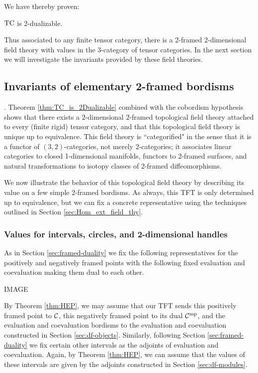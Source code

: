 \documentclass{amsart}
\begin{document}
We have thereby proven:
\begin{theorem} \label{thm:TC_is_2Dualizable}
	$\mathrm{TC}$ is 2-dualizable. 
\end{theorem}

\nid Thus associated to any finite tensor category, there is a 2-framed 2-dimensional field theory with values in the 3-category of tensor categories.  In the next section we will investigate the invariants provided by these field theories.

\subsection{Invariants of elementary 2-framed bordisms}
. %
Theorem \ref{thm:TC_is_2Dualizable} combined with the cobordism hypothesis shows that there exists a $2$-dimensional $2$-framed topological field theory attached to every (finite rigid) tensor category, and that this topological field theory is unique up to equivalence.  This field theory is ``categorified" in the sense that it is a functor of $(3,2)$-categories, not merely $2$-categories; it associates linear categories to closed 1-dimensional manifolds, functors to 2-framed surfaces, and natural transformations to isotopy classes of 2-framed diffeomorphisms. 

We now illustrate the behavior of this topological field theory by describing its value on a few simple 2-framed bordisms.  As always, this TFT is only determined up to equivalence, but we can fix a concrete representative using the techniques outlined in Section \ref{sec:Hom_ext_field_thy}.

\subsubsection{Values for intervals, circles, and 2-dimensional handles}

As in Section \ref{sec:framed-duality} we fix the following representatives for the positively and negatively framed points with the following fixed evaluation and coevaluation making them dual to each other.

IMAGE

By Theorem \ref{thm:HEP}, we may assume that our TFT sends this positively framed point to $\mathcal C$, this negatively framed point to its dual $\mathcal C^{\mathrm{mp}}$, and the evaluation and coevaluation bordisms to the evaluation and coevaluation constructed in Section \ref{sec:df-objects}.  Similarly, following Section \ref{sec:framed-duality} we fix certain other intervals as the adjoints of evaluation and coevaluation.  Again, by Theorem \ref{thm:HEP}, we can assume that the values of these intervals are given by the adjoints constructed in Section \ref{sec:df-modules}.
\end{document}
